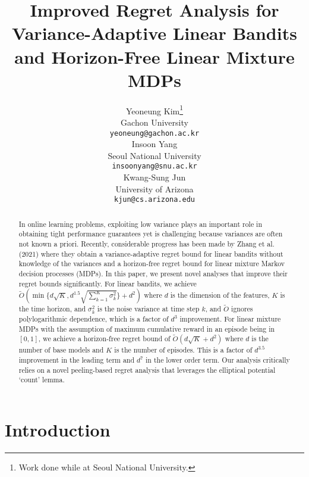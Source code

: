 \documentclass{article}
\title{Improved Regret Analysis for Variance-Adaptive Linear Bandits and Horizon-Free Linear Mixture MDPs}
\author{%
\And
  Yeoneung Kim\thanks{Work done while at Seoul National University.}\\
  Gachon University\\
  \texttt{yeoneung@gachon.ac.kr} \\
\And
  Insoon Yang\\
  Seoul National University\\
  \texttt{insoonyang@snu.ac.kr} \\
\And
  Kwang-Sung Jun\\
  University of Arizona\\
  \texttt{kjun@cs.arizona.edu} \\
}
\begin{document}

  

\setlength{\abovedisplayskip}{4pt}
\setlength{\belowdisplayskip}{3pt}
\setlength{\abovedisplayshortskip}{4pt}
\setlength{\belowdisplayshortskip}{3pt}



\maketitle


\begin{abstract}
  In online learning problems, exploiting low variance plays an important role in obtaining tight performance guarantees yet is challenging because variances are often not known a priori.
  Recently, considerable progress has been made by Zhang et al. (2021) where they obtain a variance-adaptive regret bound for linear bandits without knowledge of the variances and a horizon-free regret bound for linear mixture Markov decision processes (MDPs).
  In this paper, we present novel analyses that improve their regret bounds significantly.
  For linear bandits, we achieve $\tilde O(\min\{d\sqrt{K}, d^{1.5}\sqrt{\sum_{k=1}^K \sigma_k^2}\} + d^2)$ where $d$ is the dimension of the features, $K$ is the time horizon, and $\sigma_k^2$ is the noise variance at time step $k$, and $\tilde O$ ignores polylogarithmic dependence, which is a factor of $d^3$ improvement.
  For linear mixture MDPs with the assumption of maximum cumulative reward in an episode being in $[0,1]$, we achieve a horizon-free regret bound of $\tilde O(d \sqrt{K} + d^2)$ where $d$ is the number of base models and $K$ is the number of episodes.
  This is a factor of $d^{3.5}$ improvement in the leading term and $d^7$ in the lower order term.
  Our analysis critically relies on a novel peeling-based regret analysis that leverages the elliptical potential `count' lemma. 
\end{abstract}

\section{Introduction}
\def\VAR{\text{VAR}}
\end{document}
